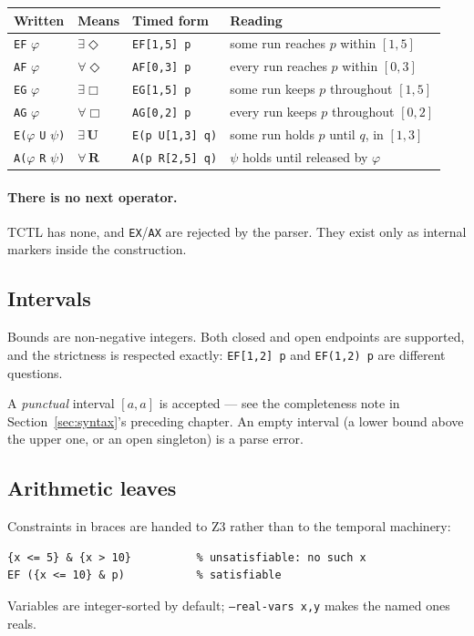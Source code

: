 \begin{center}
\begin{tabular}{llll}
\toprule
Written & Means & Timed form & Reading \\
\midrule
\texttt{EF} $\varphi$ & $\exists\Diamond$ & \texttt{EF[1,5] p} & some run reaches $p$ within $[1,5]$ \\
\texttt{AF} $\varphi$ & $\forall\Diamond$ & \texttt{AF[0,3] p} & every run reaches $p$ within $[0,3]$ \\
\texttt{EG} $\varphi$ & $\exists\Box$     & \texttt{EG[1,5] p} & some run keeps $p$ throughout $[1,5]$ \\
\texttt{AG} $\varphi$ & $\forall\Box$     & \texttt{AG[0,2] p} & every run keeps $p$ throughout $[0,2]$ \\
\texttt{E(}$\varphi$ \texttt{U} $\psi$\texttt{)} & $\exists\,\mathbf{U}$ &
  \texttt{E(p U[1,3] q)} & some run holds $p$ until $q$, in $[1,3]$ \\
\texttt{A(}$\varphi$ \texttt{R} $\psi$\texttt{)} & $\forall\,\mathbf{R}$ &
  \texttt{A(p R[2,5] q)} & $\psi$ holds until released by $\varphi$ \\
\bottomrule
\end{tabular}
\end{center}

\paragraph{There is no next operator.}
TCTL has none, and \texttt{EX}/\texttt{AX} are rejected by the parser.  They
exist only as internal markers inside the construction.

\subsection{Intervals}

Bounds are non-negative integers.  Both closed and open endpoints are supported,
and the strictness is respected exactly: \texttt{EF[1,2] p} and
\texttt{EF(1,2) p} are different questions.

A \emph{punctual} interval $[a,a]$ is accepted --- see the completeness note in
Section~\ref{sec:syntax}'s preceding chapter.  An empty interval (a lower bound
above the upper one, or an open singleton) is a parse error.

\subsection{Arithmetic leaves}

Constraints in braces are handed to Z3 rather than to the temporal machinery:

\begin{lstlisting}[style=formula]
{x <= 5} & {x > 10}          % unsatisfiable: no such x
EF ({x <= 10} & p)           % satisfiable
\end{lstlisting}

\noindent
Variables are integer-sorted by default; \texttt{--real-vars x,y} makes the
named ones reals.
